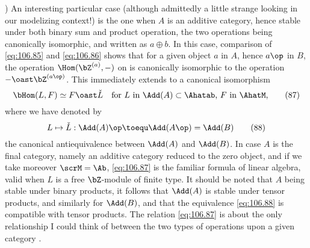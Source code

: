 \begin{remarks}
  )\enspace
  An interesting particular case (although admittedly a little strange
  looking in our modelizing context!) is the one when $A$ is an
  additive category, hence stable under both binary sum and product
  operation, the two operations being canonically isomorphic, and
  written as $a\oplus b$. In this case, comparison of
  \eqref{eq:106.85} and \eqref{eq:106.86} shows that for a given
  object $a$ in $A$, hence $a\op$ in $B$, the operation
  $\Hom(\bZ^{(a)},{-})$ on \AhatM{} is canonically isomorphic to the
  operation ${-}\oast\bZ^{(a\op)}$. This immediately extends to a
  canonical isomorphism
  \begin{equation}
    \label{eq:106.87}
    \bHom(L,F)\simeq F\oast\check L \quad
    \text{for $L$ in $\Add(A)\subset\Ahatab$, %
      $F$ in \AhatM,}
    \tag{87}
  \end{equation}
  where we have denoted by
  \begin{equation}
    \label{eq:106.88}
    L\mapsto\check L: \Add(A)\op\toequ \Add(A\op)=\Add(B)\tag{88}
  \end{equation}
  the canonical antiequivalence between $\Add(A)$ and $\Add(B)$. In
  case $A$ is the final category, namely an additive category reduced
  to the zero object, and if we take moreover $\scrM=\Ab$,
  \eqref{eq:106.87} is the familiar formula of linear algebra, valid
  when $L$ is a free $\bZ$-module of finite type. It should be noted
  that $A$ being stable under binary products, it follows that
  $\Add(A)$ is stable under tensor products, and similarly for
  $\Add(B)$, and that the equivalence \eqref{eq:106.88} is compatible
  with tensor products. The relation \eqref{eq:106.87} is about the
  only relationship I could think of between the two types of
  operations upon a given category \AhatM.


\end{remarks}
